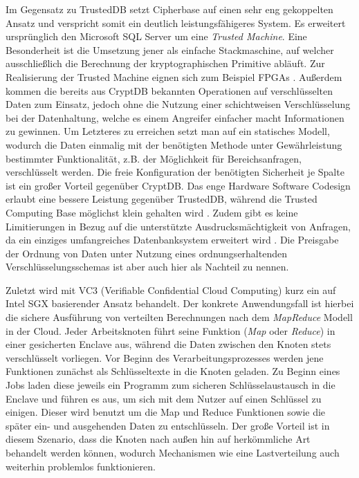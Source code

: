 Im Gegensatz zu TrustedDB setzt Cipherbase \cite{Arasu2012}\cite{Arasu} auf einen sehr eng gekoppelten Ansatz und verspricht somit ein deutlich leistungsfähigeres System. Es erweitert ursprünglich den Microsoft SQL Server um eine \textit{Trusted Machine}. Eine Besonderheit ist die Umsetzung jener als einfache Stackmaschine, auf welcher ausschließlich die Berechnung der kryptographischen Primitive abläuft. Zur Realisierung der Trusted Machine eignen sich zum Beispiel FPGAs \cite{Arasu}. Außerdem kommen die bereits aus CryptDB bekannten Operationen auf verschlüsselten Daten zum Einsatz, jedoch ohne die Nutzung einer schichtweisen Verschlüsselung bei der Datenhaltung, welche es einem Angreifer einfacher macht Informationen zu gewinnen. Um Letzteres zu erreichen setzt man auf ein statisches Modell, wodurch die Daten einmalig mit der benötigten Methode unter Gewährleistung bestimmter Funktionalität, z.B. der Möglichkeit für Bereichsanfragen, verschlüsselt werden. Die freie Konfiguration der benötigten Sicherheit je Spalte ist ein großer Vorteil gegenüber CryptDB. Das enge Hardware Software Codesign erlaubt eine bessere Leistung gegenüber TrustedDB, während die Trusted Computing Base möglichst klein gehalten wird \cite{Arasu}. Zudem gibt es keine Limitierungen in Bezug auf die unterstützte Ausdrucksmächtigkeit von Anfragen, da ein einziges umfangreiches Datenbanksystem erweitert wird \cite{Arasu2013}. Die Preisgabe der Ordnung von Daten unter Nutzung eines ordnungserhaltenden Verschlüsselungsschemas ist aber auch hier als Nachteil zu nennen.

Zuletzt wird mit VC3 (Verifiable Confidential Cloud Computing) \cite{Schuster2015} kurz ein auf Intel SGX basierender Ansatz behandelt. Der konkrete Anwendungsfall ist hierbei die sichere Ausführung von verteilten Berechnungen nach dem \textit{MapReduce} Modell in der Cloud. Jeder Arbeitsknoten führt seine Funktion (\textit{Map} oder \textit{Reduce}) in einer gesicherten Enclave aus, während die Daten zwischen den Knoten stets verschlüsselt vorliegen. Vor Beginn des Verarbeitungsprozesses werden jene Funktionen zunächst als Schlüsseltexte in die Knoten geladen. Zu Beginn eines Jobs laden diese jeweils ein Programm zum sicheren Schlüsselaustausch in die Enclave und führen es aus, um sich mit dem Nutzer auf einen Schlüssel zu einigen. Dieser wird benutzt um die Map und Reduce Funktionen sowie die später ein- und ausgehenden Daten zu entschlüsseln. Der große Vorteil ist in diesem Szenario, dass die Knoten nach außen hin auf herkömmliche Art behandelt werden können, wodurch Mechanismen wie eine Lastverteilung auch weiterhin problemlos funktionieren.

